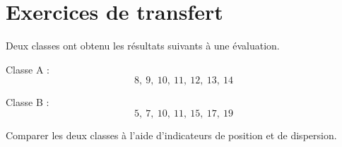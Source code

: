 \section{Exercices de transfert}

\begin{cadreenonce}
Deux classes ont obtenu les résultats suivants à une évaluation.

\medskip

Classe A :
\[
8,\ 9,\ 10,\ 11,\ 12,\ 13,\ 14
\]

Classe B :
\[
5,\ 7,\ 10,\ 11,\ 15,\ 17,\ 19
\]

Comparer les deux classes à l’aide d’indicateurs de position et de dispersion.
\end{cadreenonce}